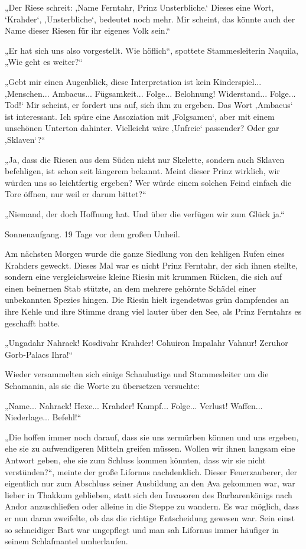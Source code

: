 „Der Riese schreit: ,Name Ferntahr, Prinz Unsterbliche.‘ Dieses eine Wort, ‘Krahder‘, ‚Unsterbliche‘, bedeutet noch mehr. Mir scheint, das könnte auch der Name dieser Riesen für ihr eigenes Volk sein.“

„Er hat sich uns also vorgestellt. Wie höflich“, spottete Stammesleiterin Naquila, „Wie geht es weiter?“

„Gebt mir einen Augenblick, diese Interpretation ist kein Kinderspiel... ‚Menschen... Ambacus... Fügsamkeit... Folge... Belohnung! Widerstand... Folge... Tod!‘ Mir scheint, er fordert uns auf, sich ihm zu ergeben. Das Wort ‚Ambacus‘ ist interessant. Ich spüre eine Assoziation mit ‚Folgsamen‘, aber mit einem unschönen Unterton dahinter. Vielleicht wäre ‚Unfreie‘ passender? Oder gar ‚Sklaven‘?“

„Ja, dass die Riesen aus dem Süden nicht nur Skelette, sondern auch Sklaven befehligen, ist schon seit längerem bekannt. Meint dieser Prinz wirklich, wir würden uns so leichtfertig ergeben? Wer würde einem solchen Feind einfach die Tore öffnen, nur weil er darum bittet?“

„Niemand, der doch Hoffnung hat. Und über die verfügen wir zum Glück ja.“\bigskip







Sonnenaufgang. 19 Tage vor dem großen Unheil.\bigskip



Am nächsten Morgen wurde die ganze Siedlung von den kehligen Rufen eines Krahders geweckt. Dieses Mal war es nicht Prinz Ferntahr, der sich ihnen stellte, sondern eine vergleichsweise kleine Riesin mit krummen Rücken, die sich auf einen beinernen Stab stützte, an dem mehrere gehörnte Schädel einer unbekannten Spezies hingen. Die Riesin hielt irgendetwas grün dampfendes an ihre Kehle und ihre Stimme drang viel lauter über den See, als Prinz Ferntahrs es geschafft hatte.

„Ungadahr Nahrack! Kosdivahr Krahder! Cohuiron Impalahr Vahnur! Zeruhor Gorb-Palacs Ihra!“

Wieder versammelten sich einige Schaulustige und Stammesleiter um die Schamanin, als sie die Worte zu übersetzen versuchte:

„Name... Nahrack! Hexe... Krahder! Kampf... Folge... Verlust! Waffen... Niederlage... Befehl!“

„Die hoffen immer noch darauf, dass sie uns zermürben können und uns ergeben, ehe sie zu aufwendigeren Mitteln greifen müssen. Wollen wir ihnen langsam eine Antwort geben, ehe sie zum Schluss kommen könnten, dass wir sie nicht verstünden?“, meinte der große Lifornus nachdenklich. Dieser Feuerzauberer, der eigentlich nur zum Abschluss seiner Ausbildung an den Ava gekommen war, war lieber in Thakkum geblieben, statt sich den Invasoren des Barbarenkönigs nach Andor anzuschließen oder alleine in die Steppe zu wandern. Es war möglich, dass er nun daran zweifelte, ob das die richtige Entscheidung gewesen war. Sein einst so schneidiger Bart war ungepflegt und man sah Lifornus immer häufiger in seinem Schlafmantel umherlaufen.

